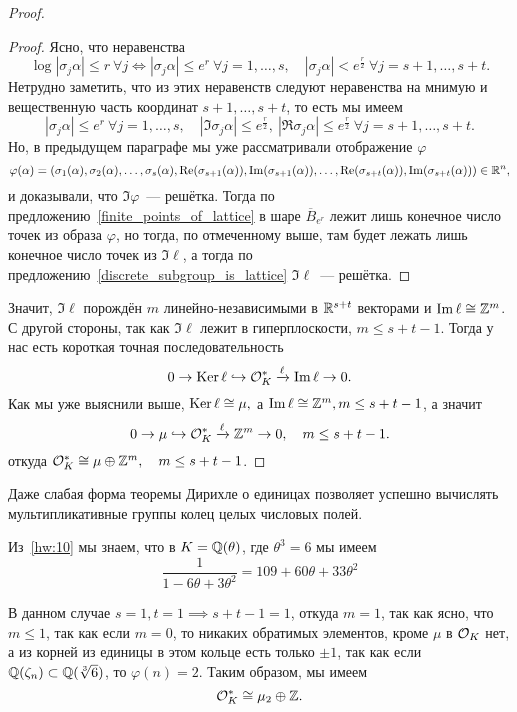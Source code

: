 \begin{proof}
\begin{proof}
			Ясно, что неравенства
			\[
				\log|\sigma_{j}\alpha| \le r \ \forall j \Leftrightarrow |\sigma_{j}\alpha| \le e^{r} \ \forall j = 1, \ldots, s, \quad |\sigma_{j}\alpha| < e^{\frac{r}{2}} \ \forall j = s + 1,\ldots, s + t.
			\]
			Нетрудно заметить, что из этих неравенств следуют неравенства на мнимую и вещественную часть координат $s + 1, \ldots, s + t$, то есть мы имеем
			\[
				|\sigma_{j}\alpha| \le e^{r} \ \forall j = 1, \ldots, s, \quad |\Im\sigma_{j}\alpha| \le  e^{\frac{r}{2}}, \ |\Re\sigma_{j}\alpha| \le  e^{\frac{r}{2}} \ \forall j = s + 1,\ldots, s + t.
			\]
			Но, в предыдущем параграфе мы уже рассматривали отображение $\varphi$
			\[	  	
				\varphi(\alpha) = (\sigma_1(\alpha), \sigma_2(\alpha), \ldots, \sigma_s(\alpha), \mathop{\mathrm{Re}}\nolimits(\sigma_{s + 1}(\alpha)), \mathop{\mathrm{Im}}\nolimits(\sigma_{s + 1}(\alpha)),  \ldots, \mathop{\mathrm{Re}}\nolimits(\sigma_{s + t}(\alpha)), \mathop{\mathrm{Im}}\nolimits(\sigma_{s + t}(\alpha))) \in \mathbb{R}^n,
			\]
			и доказывали, что $\Im{\varphi}$~--- решётка. Тогда по предложению~\ref{finite_points_of_lattice} в шаре $\overline{B}_{e^{r}}$  лежит лишь конечное число точек из образа $\varphi$, но тогда, по отмеченному выше, там будет лежать лишь конечное число точек из $\Im{\ell}$, а тогда по предложению~\ref{discrete_subgroup_is_lattice} $\Im{\ell}$~--- решётка. 
		\end{proof}

		Значит, $\Im{\ell}$ порождён $m$ линейно-независимыми в $\mathbb{R}^{s + t}$ векторами и  $\mathop{\mathrm{Im}}\nolimits{\ell} \cong \mathbb{Z}^{m}$. С другой стороны, так как $\Im{\ell}$ лежит в гиперплоскости, $m \le s + t - 1$.  Тогда у нас есть короткая точная последовательность 
		\[
		 	0 \to \operatorname{Ker}{\ell} \hookrightarrow \mathcal{O}_{K}^{*} \xrightarrow{\ell} \mathop{\mathrm{Im}}\nolimits{\ell} \to 0.
		 \] 
		 Как мы уже выяснили выше, $\operatorname{Ker}{\ell} \cong \mu,$ а $\mathop{\mathrm{Im}}\nolimits{\ell} \cong \mathbb{Z}^{m}, m \le s + t - 1$, а значит 
		 \[
		 	0 \to \mu \hookrightarrow \mathcal{O}_{K}^{*}  \xrightarrow{\ell} \mathbb{Z}^{m} \to 0, \quad m \le s + t - 1. 
		 \]
		 откуда $\mathcal{O}_{K}^{*} \cong \mu \oplus \mathbb{Z}^{m}, \quad m \le s + t - 1$. 
	\end{proof}

	Даже слабая форма теоремы Дирихле о единицах позволяет успешно вычислять мультипликативные группы колец целых числовых полей. 

	\begin{example}
		Из~\ref{hw:10} мы знаем, что в $K = \mathbb{Q}(\theta)$, где $\theta^3 = 6$ мы имеем
		\[ \frac{1}{1 - 6 \theta + 3\theta^2} = 109 + 60\theta + 33\theta^2 \]

		В данном случае $s = 1, t = 1 \implies s + t - 1 = 1$, откуда $m = 1$, так как ясно, что $m \le 1$, так как если $m = 0$, то никаких обратимых элементов, кроме $\mu$ в $\mathcal{O}_{K}$ нет, а из корней из единицы в этом кольце есть только $\pm 1$, так как  если $\mathbb{Q}(\zeta_n) \subset \mathbb{Q}(\sqrt[3]{6})$, то $\varphi(n) = 2$. Таким образом, мы имеем 
		\[
			\mathcal{O}_{K}^* \cong \mu_{2} \oplus \mathbb{Z}.
		\]
	\end{example}


